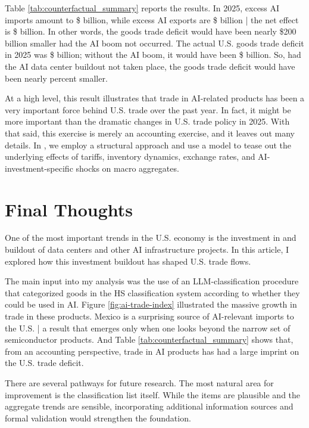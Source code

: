 \documentclass[12pt,pdftex]{article}
\begin{document}
\begin{onehalfspacing}
Table \ref{tab:counterfactual_summary} reports the results. In 2025, excess AI imports amount to \$\cfExcessAiImports{} billion, while excess AI exports are \$\cfExcessAiExports{} billion | the net effect is \$\cfNetAiEffect{} billion. In other words, the goods trade deficit would have been nearly \$200 billion smaller had the AI boom not occurred. The actual U.S. goods trade deficit in 2025 was \$\cfActualDeficit{} billion; without the AI boom, it would have been \$\cfCounterfactualDeficit{} billion. So, had the AI data center buildout not taken place, the goods trade deficit would have been nearly \cfDeficitReductionPct{} percent smaller.

At a high level, this result illustrates that trade in AI-related products has been a very important force behind U.S. trade over the past year. In fact, it might be more important than the dramatic changes in U.S. trade policy in 2025. With that said, this exercise is merely an accounting exercise, and it leaves out many details. In \citet{ferrante2026missingtrade}, we employ a structural approach and use a model to tease out the underlying effects of tariffs, inventory dynamics, exchange rates, and AI-investment-specific shocks on macro aggregates. 

\section*{Final Thoughts}

One of the most important trends in the U.S. economy is the investment in and buildout of data centers and other AI infrastructure projects. In this article, I explored how this investment buildout has shaped U.S. trade flows. 

The main input into my analysis was the use of an LLM-classification procedure that categorized goods in the HS classification system according to whether they could be used in AI. Figure \ref{fig:ai-trade-index} illustrated the massive growth in trade in these products. Mexico is a surprising source of AI-relevant imports to the U.S. | a result that emerges only when one looks beyond the narrow set of semiconductor products. And Table \ref{tab:counterfactual_summary} shows that, from an accounting perspective, trade in AI products has had a large imprint on the U.S. trade deficit.

There are several pathways for future research. The most natural area for improvement is the classification list itself. While the items are plausible and the aggregate trends are sensible, incorporating additional information sources and formal validation would strengthen the foundation.


\end{onehalfspacing}
\end{document}
